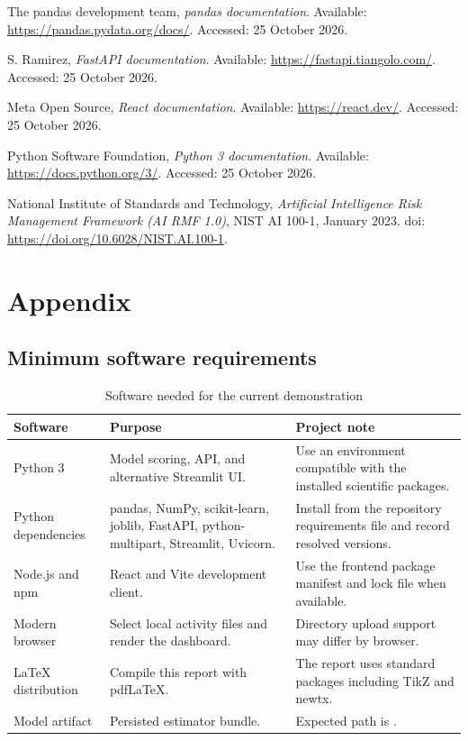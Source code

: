 \begin{thebibliography}{99}
The pandas development team,
\emph{pandas documentation}.
Available: \url{https://pandas.pydata.org/docs/}.
Accessed: 25 October 2026.

S. Ramirez,
\emph{FastAPI documentation}.
Available: \url{https://fastapi.tiangolo.com/}.
Accessed: 25 October 2026.

Meta Open Source,
\emph{React documentation}.
Available: \url{https://react.dev/}.
Accessed: 25 October 2026.

Python Software Foundation,
\emph{Python 3 documentation}.
Available: \url{https://docs.python.org/3/}.
Accessed: 25 October 2026.

National Institute of Standards and Technology,
\emph{Artificial Intelligence Risk Management Framework (AI RMF 1.0)},
NIST AI 100-1, January 2023.
doi: \url{https://doi.org/10.6028/NIST.AI.100-1}.
\end{thebibliography}\label{chap:last-reference-page}


\chapter{Appendix}
\label{chap:appendix}

\section{Minimum software requirements}
\label{app:software}
\begin{table}[H]
\centering
\tablefont
\caption{Software needed for the current demonstration}
\label{tab:software-requirements}
\begin{tabularx}{\textwidth}{|p{}|p{}|Y|}
\hline
\textbf{Software} & \textbf{Purpose} & \textbf{Project note}\\\hline
Python 3 & Model scoring, API, and alternative Streamlit UI. & Use an environment compatible with the installed scientific packages.\\\hline
Python dependencies & pandas, NumPy, scikit-learn, joblib, FastAPI, python-multipart, Streamlit, Uvicorn. & Install from the repository requirements file and record resolved versions.\\\hline
Node.js and npm & React and Vite development client. & Use the frontend package manifest and lock file when available.\\\hline
Modern browser & Select local activity files and render the dashboard. & Directory upload support may differ by browser.\\\hline
LaTeX distribution & Compile this report with pdfLaTeX. & The report uses standard packages including TikZ and newtx.\\\hline
Model artifact & Persisted estimator bundle. & Expected path is .\\\hline
\end{tabularx}
\end{table}

